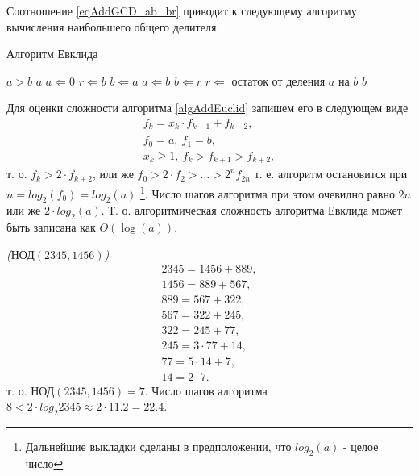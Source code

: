 Соотношение \eqref{eqAddGCD_ab_br} приводит к следующему алгоритму
вычисления наибольшего общего делителя
\begin{algorithm}
\caption{Алгоритм Евклида}
\begin{algorithmic}
    \STATE $a > b$
        \RETURN $a$
    \ENDIF
    \STATE $a \Leftarrow 0$
    \STATE $r \Leftarrow b$
    \STATE $b \Leftarrow a$
    \REPEAT
        \STATE $a \Leftarrow b$
        \STATE $b \Leftarrow r$
        \STATE $r \Leftarrow $ остаток от деления $a$ на $b$
    \RETURN $b$
\end{algorithmic}
\label{algAddEuclid}
\end{algorithm}

Для оценки сложности алгоритма \ref{algAddEuclid} запишем его в
следующем виде 
\begin{eqnarray}
f_k = x_k \cdot f_{k + 1} + f_{k + 2},
\nonumber \\
f_0 = a, \: f_1 = b,
\nonumber \\
x_k \ge 1, \: f_k > f_{k+1} > f_{k + 2},
\nonumber
\end{eqnarray}
т. о. $f_k > 2 \cdot f_{k + 2}$, или же 
$f_0 > 2 \cdot f_2 > \dots > 2^nf_{2n}$ т. е. алгоритм остановится при
$n = log_2\left(f_0\right) = log_2\left(a\right)$
\footnote{Дальнейшие выкладки сделаны в предположении, что
  $log_2\left(a\right)$ - целое число}. Число шагов
алгоритма при этом очевидно равно $2n$ или же 
$2 \cdot log_2\left(a\right)$. Т. о. алгоритмическая сложность
алгоритма Евклида может быть записана как 
$O\left(\log \left(a\right)\right)$.


\begin{example}
\emph{($\mbox{НОД}\left(2345,1456\right)$)}
\begin{eqnarray}
2345 = 1456 + 889,
\nonumber \\
1456 = 889 + 567,
\nonumber \\
889 = 567 + 322,
\nonumber \\
567 = 322 + 245,
\nonumber \\
322 = 245 + 77,
\nonumber \\
245 = 3 \cdot 77 + 14,
\nonumber \\
77 = 5 \cdot 14 + 7,
\nonumber \\
14 = 2 \cdot 7.
\nonumber
\end{eqnarray}
т. о. $\mbox{НОД}\left(2345,1456\right) = 7$. 
Число шагов алгоритма  $8 < 2 \cdot log_2{2345} \approx 2 \cdot 11.2 = 22.4$.
\nonumber
\end{example}
